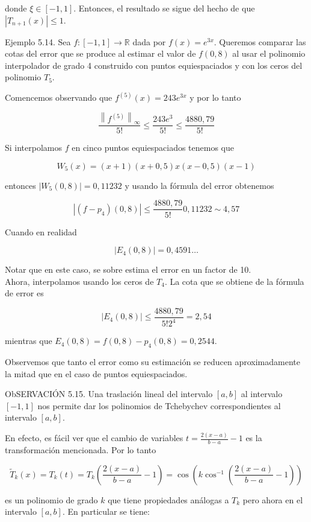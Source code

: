 \documentclass[10pt]{book}
\begin{document}
donde $\xi \in[-1,1]$. Entonces, el resultado se sigue del hecho de que $\left|T_{n+1}(x)\right| \leq 1$.

Ejemplo 5.14. Sea $f:[-1,1] \rightarrow \mathbb{R}$ dada por $f(x)=e^{3 x}$. Queremos comparar las cotas del error que se produce al estimar el valor de $f(0,8)$ al usar el polinomio interpolador de grado 4 construido con puntos equiespaciados y con los ceros del polinomio $T_{5}$.

Comencemos observando que $f^{(5)}(x)=243 e^{3 x}$ y por lo tanto

$$
\frac{\left\|f^{(5)}\right\|_{\infty}}{5!} \leq \frac{243 e^{3}}{5!} \leq \frac{4880,79}{5!}
$$

Si interpolamos $f$ en cinco puntos equiespaciados tenemos que

$$
W_{5}(x)=(x+1)(x+0,5) x(x-0,5)(x-1)
$$

entonces $\left|W_{5}(0,8)\right|=0,11232$ y usando la fórmula del error obtenemos

$$
\left|\left(f-p_{4}\right)(0,8)\right| \leq \frac{4880,79}{5!} 0,11232 \sim 4,57
$$

Cuando en realidad

$$
\left|E_{4}(0,8)\right|=0,4591 \ldots
$$

Notar que en este caso, se sobre estima el error en un factor de 10.\\
Ahora, interpolamos usando los ceros de $T_{4}$. La cota que se obtiene de la fórmula de error es

$$
\left|E_{4}(0,8)\right| \leq \frac{4880,79}{5!2^{4}}=2,54
$$

mientras que $E_{4}(0,8)=f(0,8)-p_{4}(0,8)=0,2544$.

Observemos que tanto el error como su estimación se reducen aproximadamente la mitad que en el caso de puntos equiespaciados.

ObSERVACIÓN 5.15. Una traslación lineal del intervalo $[a, b]$ al intervalo $[-1,1]$ nos permite dar los polinomios de Tchebychev correspondientes al intervalo $[a, b]$.

En efecto, es fácil ver que el cambio de variables $t=\frac{2(x-a)}{b-a}-1$ es la transformación mencionada. Por lo tanto

$$
\widetilde{T}_{k}(x)=T_{k}(t)=T_{k}\left(\frac{2(x-a)}{b-a}-1\right)=\cos \left(k \cos ^{-1}\left(\frac{2(x-a)}{b-a}-1\right)\right)
$$

es un polinomio de grado $k$ que tiene propiedades análogas a $T_{k}$ pero ahora en el intervalo $[a, b]$. En particular se tiene:
\end{document}
